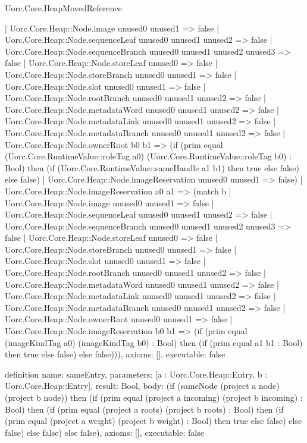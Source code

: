 \begin{lexlean}{Uorc.Core.HeapMovedReference}
\begin{semanticmodule}
{      | Uorc.Core.Heap::Node.image unused0 unused1 => false
      | Uorc.Core.Heap::Node.sequenceLeaf unused0 unused1 unused2 => false
      | Uorc.Core.Heap::Node.sequenceBranch unused0 unused1 unused2 unused3 => false
      | Uorc.Core.Heap::Node.storeLeaf unused0 => false
      | Uorc.Core.Heap::Node.storeBranch unused0 unused1 => false
      | Uorc.Core.Heap::Node.slot unused0 unused1 => false
      | Uorc.Core.Heap::Node.rootBranch unused0 unused1 unused2 => false
      | Uorc.Core.Heap::Node.metadataWord unused0 unused1 unused2 => false
      | Uorc.Core.Heap::Node.metadataLink unused0 unused1 unused2 => false
      | Uorc.Core.Heap::Node.metadataBranch unused0 unused1 unused2 => false
      | Uorc.Core.Heap::Node.ownerRoot b0 b1 => (if (prim equal (Uorc.Core.RuntimeValue::roleTag a0) (Uorc.Core.RuntimeValue::roleTag b0) : Bool) then (if (Uorc.Core.RuntimeValue::sameHandle a1 b1) then true else false) else false)
      | Uorc.Core.Heap::Node.imageReservation unused0 unused1 => false)
    | Uorc.Core.Heap::Node.imageReservation a0 a1 => (match b
      | Uorc.Core.Heap::Node.image unused0 unused1 => false
      | Uorc.Core.Heap::Node.sequenceLeaf unused0 unused1 unused2 => false
      | Uorc.Core.Heap::Node.sequenceBranch unused0 unused1 unused2 unused3 => false
      | Uorc.Core.Heap::Node.storeLeaf unused0 => false
      | Uorc.Core.Heap::Node.storeBranch unused0 unused1 => false
      | Uorc.Core.Heap::Node.slot unused0 unused1 => false
      | Uorc.Core.Heap::Node.rootBranch unused0 unused1 unused2 => false
      | Uorc.Core.Heap::Node.metadataWord unused0 unused1 unused2 => false
      | Uorc.Core.Heap::Node.metadataLink unused0 unused1 unused2 => false
      | Uorc.Core.Heap::Node.metadataBranch unused0 unused1 unused2 => false
      | Uorc.Core.Heap::Node.ownerRoot unused0 unused1 => false
      | Uorc.Core.Heap::Node.imageReservation b0 b1 => (if (prim equal (imageKindTag a0) (imageKindTag b0) : Bool) then (if (prim equal a1 b1 : Bool) then true else false) else false))),
  axioms: [],
  executable: false
}

definition{
  name: sameEntry,
  parameters: [a : Uorc.Core.Heap::Entry, b : Uorc.Core.Heap::Entry],
  result: Bool,
  body: (if (sameNode (project a node) (project b node)) then (if (prim equal (project a incoming) (project b incoming) : Bool) then (if (prim equal (project a roots) (project b roots) : Bool) then (if (prim equal (project a weight) (project b weight) : Bool) then true else false) else false) else false) else false),
  axioms: [],
  executable: false
}


\end{semanticmodule}
\end{lexlean}
